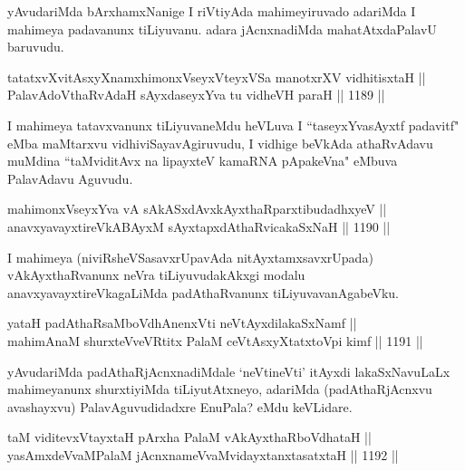 \begin{artha}
yAvudariMda bArxhamxNanige I riVtiyAda mahimeyiruvado adariMda I mahimeya padavanunx tiLiyuvanu. adara jAcnxnadiMda mahatAtxdaPalavU baruvudu.
\end{artha}


\begin{shl}
tatatxvXvitAsxyXnamxhimonxV\s seyxVteyxVSa manotxrXV vidhitisxtaH || \\
PalavAdoV\s thaRvAdaH sAyxdaseyxYva tu vidheVH paraH ||  1189 ||  
\end{shl}

\begin{artha}
I mahimeya tatavxvanunx tiLiyuvaneMdu heVLuva I ``taseyxYvasAyxtf padavitf" eMba maMtarxvu vidhiviSayavAgiruvudu, I vidhige beVkAda athaRvAdavu muMdina ``taMviditAvx na lipayxteV kamaRNA pApakeVna" eMbuva PalavAdavu Aguvudu.
\end{artha}

\begin{shl}
mahimonxV\s seyxYva vA sAkASxdAvxkAyxthaRparxtibudadhxyeV || \\
anavxyavayxtireVkABAyxM sAyxtapxdAthaRvicakaSxNaH ||  1190 ||  
\end{shl}

\begin{artha}
I mahimeya (niviRsheVSasavxrUpavAda nitAyxtamxsavxrUpada) vAkAyxthaRvanunx neVra tiLiyuvudakAkxgi modalu anavxyavayxtireVkagaLiMda padAthaRvanunx tiLiyuvavanAgabeVku.
\end{artha}


\begin{shl}
yataH padAthaRsaMboVdhAnenxVti neVtAyxdilakaSxNamf || \\
mahimAnaM shurxteVveVRtitx PalaM ceVtAsxyXtatxtoV\s pi kimf ||  1191 ||  
\end{shl}

\begin{artha}
yAvudariMda padAthaRjAcnxnadiMdale `neVtineVti' itAyxdi lakaSxNavuLaLx mahimeyanunx shurxtiyiMda tiLiyutAtxneyo, adariMda (padAthaRjAcnxvu avashayxvu) PalavAguvudidadxre EnuPala? eMdu keVLidare.
\end{artha}

\begin{shl}
taM viditevxVtayxtaH pArxha PalaM vAkAyxthaRboVdhataH || \\
yasAmxdeVvaMPalaM jAcnxnameVvaMvidayxtanxtasatxtaH ||  1192 ||  
\end{shl}
				
